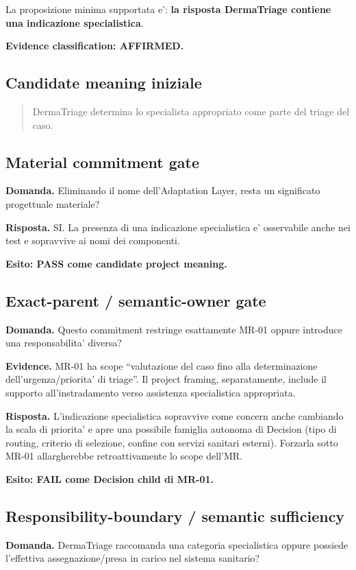 \documentclass[11pt,a4paper]{article}
\begin{document}
La proposizione minima supportata e': \textbf{la risposta DermaTriage contiene una indicazione specialistica}.\par
\textbf{Evidence classification: AFFIRMED.}

\subsection{Candidate meaning iniziale}
\begin{quote}
DermaTriage determina lo specialista appropriato come parte del triage del caso.
\end{quote}

\subsection{Material commitment gate}
\begin{ddtacheck}
\textbf{Domanda.} Eliminando il nome dell'Adaptation Layer, resta un significato progettuale materiale?
\end{ddtacheck}
\textbf{Risposta.} SI. La presenza di una indicazione specialistica e' osservabile anche nei test e sopravvive ai nomi dei componenti.\par
\textbf{Esito: PASS come candidate project meaning.}

\subsection{Exact-parent / semantic-owner gate}
\begin{ddtacheck}
\textbf{Domanda.} Questo commitment restringe esattamente MR-01 oppure introduce una responsabilita' diversa?
\end{ddtacheck}

\textbf{Evidence.} MR-01 ha scope ``valutazione del caso fino alla determinazione dell'urgenza/priorita' di triage''. Il project framing, separatamente, include il supporto all'instradamento verso assistenza specialistica appropriata.

\textbf{Risposta.} L'indicazione specialistica sopravvive come concern anche cambiando la scala di priorita' e apre una possibile famiglia autonoma di Decision (tipo di routing, criterio di selezione, confine con servizi sanitari esterni). Forzarla sotto MR-01 allargherebbe retroattivamente lo scope dell'MR.

\textbf{Esito: FAIL come Decision child di MR-01.}

\subsection{Responsibility-boundary / semantic sufficiency}
\begin{ddtacheck}
\textbf{Domanda.} DermaTriage raccomanda una categoria specialistica oppure possiede l'effettiva assegnazione/presa in carico nel sistema sanitario?
\end{ddtacheck}
\end{document}
